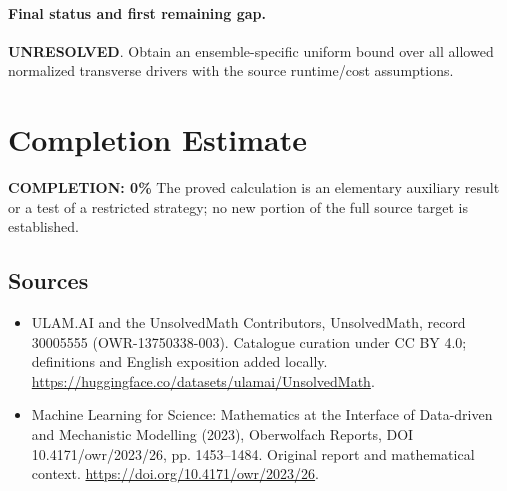 \documentclass[11pt]{article}
\begin{document}
\paragraph{Final status and first remaining gap.}
\textbf{UNRESOLVED}. Obtain an ensemble-specific uniform bound over all allowed normalized transverse drivers with the source runtime/cost assumptions.

\section{Completion Estimate}
\noindent\textbf{COMPLETION: 0\%}
The proved calculation is an elementary auxiliary result or a test of a restricted strategy; no new portion of the full source target is established.

\subsection{Sources}
\begin{itemize}
\item[\hypertarget{source:30005555:1}{S1}] ULAM.AI and the UnsolvedMath Contributors, UnsolvedMath, record 30005555 (OWR-13750338-003). Catalogue curation under CC BY 4.0; definitions and English exposition added locally.
\url{https://huggingface.co/datasets/ulamai/UnsolvedMath}.
\item[\hypertarget{source:30005555:2}{S2}] Machine Learning for Science: Mathematics at the Interface of Data-driven and Mechanistic Modelling (2023), Oberwolfach Reports, DOI 10.4171/owr/2023/26, pp. 1453--1484. Original report and mathematical context.
\url{https://doi.org/10.4171/owr/2023/26}.
\end{itemize}
\label{end:30005555}
\end{document}
